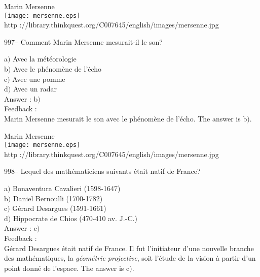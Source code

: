 \documentclass[letterpaper, 12pt]{article}
\begin{document}
        \begin{center}
        Marin Mersenne\\
    \texttt{[image: mersenne.eps]}\\
        {\footnotesize http
://library.thinkquest.org/C007645/english/images/mersenne.jpg}
    \end{center}

997-- Comment Marin Mersenne mesurait-il le son?

a$)$ Avec la m\'et\'eorologie \\
b$)$ Avec le ph\'enom\`ene de l'\'echo \\
c$)$ Avec une pomme \\
d$)$ Avec un radar\\

Answer : b$)$\\

Feedback : \\
Marin Mersenne mesurait le son avec le ph\'enom\`ene de l'\'echo.
The answer is b$)$.\\

        \begin{center}
        Marin Mersenne\\
    \texttt{[image: mersenne.eps]}\\
        {\footnotesize http
://library.thinkquest.org/C007645/english/images/mersenne.jpg}
    \end{center}

998-- Lequel des math\'ematiciens suivants \'etait natif de France?

a$)$ Bonaventura Cavalieri (1598-1647) \\
b$)$ Daniel Bernoulli (1700-1782) \\
c$)$ G\'erard Desargues (1591-1661) \\
d$)$ Hippocrate de Chios (470-410 av. J.-C.)\\

Answer : c$)$\\

Feedback : \\
G\'erard Desargues \'etait natif de France. Il fut l'initiateur
d'une nouvelle branche des math\'ematiques, la {\sl g\'eom\'etrie
projective}, soit l'\'etude de la vision \`a partir d'un point
donn\'e de l'espace.
The answer is c$)$.\\

\end{document}
